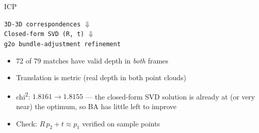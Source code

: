 \documentclass[aspectratio=169]{beamer}
\begin{document}
\begin{frame}{ICP}
  \begin{center}
    \texttt{3D-3D correspondences} $\Downarrow$\\
    \texttt{Closed-form SVD (R, t)} $\Downarrow$\\
    \texttt{g2o bundle-adjustment refinement}
  \end{center}

  \begin{itemize}
    \item 72 of 79 matches have valid depth in \emph{both} frames
    \item Translation is metric (real depth in both point clouds)
    \item chi\textsuperscript{2}: $1.8161 \to 1.8155$ --- the closed-form SVD
          solution is already at (or very near) the optimum, so BA has
          little left to improve
    \item Check: $R\,p_2 + t \approx p_1$ verified on sample points
  \end{itemize}
\end{frame}



\end{document}
